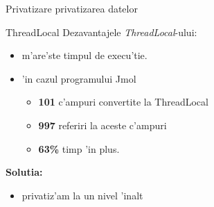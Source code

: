 \documentclass{beamer}
\begin{document}
\begin{frame}{Privatizare}
\Huge
privatizarea datelor
\end{frame}

\begin{frame}{ThreadLocal}
\Large
Dezavantajele \emph{ThreadLocal}-ului:
\begin{itemize}
  \item \pause m'are'ste timpul de execu'tie. 
  \item \pause 'in cazul programului Jmol
  \begin{itemize}
	\Large
    \item \pause \textbf{101} c'ampuri convertite la ThreadLocal
    \item \pause \textbf{997} referiri la aceste c'ampuri
    \item \pause \pause \textbf{63\%} timp 'in plus.
  \end{itemize}
\end{itemize}
\end{frame}

\begin{frame}
\huge
\textbf{{Solutia:}}
\begin{itemize}
  \item \pause privatiz'am la un nivel 'inalt
\end{itemize}
\end{frame}

% 
% 
%    
% 
\end{document}
